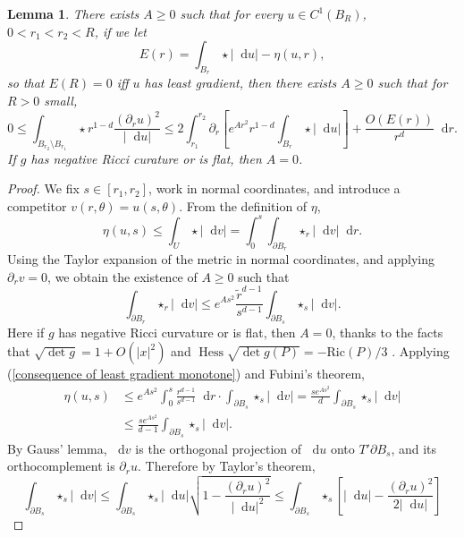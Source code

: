 \documentclass[reqno,10pt]{amsart}
\DeclareMathOperator{\Hess}{Hess}
\newcommand{\Ric}{\mathrm{Ric}}
\newcommand*\dif{\mathop{}\!\mathrm{d}}
\newtheorem{lemma}[theorem]{Lemma}
\theoremstyle{definition}
\numberwithin{equation}{section}
\begin{document}
\begin{lemma}\label{monotonicity lemma}
There exists $A \geq 0$ such that for every $u \in C^1(B_R)$, $0 < r_1 < r_2 < R$, if we let
$$E(r) = \int_{B_r} \star |\dif u| - \eta(u, r),$$
so that $E(R) = 0$ iff $u$ has least gradient, then there exists $A \geq 0$ such that for $R > 0$ small,
\begin{equation}\label{monotonicity lemma eqn}
0 \leq \int_{B_{r_2} \setminus B_{r_1}} \star r^{1 - d}\frac{(\partial_ru)^2}{|\dif u|} \leq 2\int_{r_1}^{r_2} \partial_r \left[e^{Ar^2} r^{1-d}\int_{B_r} \star |\dif u|\right] + \frac{O(E(r))}{r^d} \dif r.
\end{equation}
If $g$ has negative Ricci curature or is flat, then $A = 0$.
\end{lemma}
\begin{proof}
We fix $s \in [r_1, r_2]$, work in normal coordinates, and introduce a competitor $v(r, \theta) = u(s, \theta)$.
From the definition of $\eta$,
\begin{equation}\label{consequence of least gradient monotone}
    \eta(u, s) \leq \int_U \star |\dif v| = \int_0^s \int_{\partial B_r} \star_r |\dif v| \dif r.
\end{equation}
Using the Taylor expansion of the metric in normal coordinates, and applying $\partial_r v = 0$, we obtain the existence of $A \geq 0$ such that
\begin{equation}\label{introduce the ricci tensor}
\int_{\partial B_r} \star_r |\dif v| \leq e^{As^2} \frac{\tilde r^{d - 1}}{s^{d - 1}} \int_{\partial B_s} \star_s |\dif v|.
\end{equation}
Here if $g$ has negative Ricci curvature or is flat, then $A = 0$, thanks to the facts that $\sqrt{\det g} = 1 + O(|x|^2)$ and $\Hess \sqrt{\det g(P)} = -\Ric(P)/3$ \cite[Lemma 3.4]{schoen1994lectures}.
Applying (\ref{consequence of least gradient monotone}) and Fubini's theorem,
\begin{align*}
\eta(u, s) &\leq  e^{As^2} \int_0^s \frac{r^{d - 1}}{s^{d - 1}} \dif r \cdot \int_{\partial B_s} \star_s |\dif v| = \frac{s e^{As^2}}{d} \int_{\partial B_s} \star_s |\dif v|\\
&\leq \frac{s e^{As^2}}{d - 1} \int_{\partial B_s} \star_s |\dif v|.
\end{align*}
By Gauss' lemma, $\dif v$ is the orthogonal projection of $\dif u$ onto $T' \partial B_s$, and its orthocomplement is $\partial_r u$. Therefore by Taylor's theorem,
$$\int_{\partial B_s} \star_s |\dif v| \leq \int_{\partial B_s} \star_s |\dif u| \sqrt{1 - \frac{(\partial_r u)^2}{|\dif u|^2}} \leq \int_{\partial B_s} \star_s \left[|\dif u| - \frac{(\partial_r u)^2}{2 |\dif u|}\right]$$

\end{proof}
\end{document}
